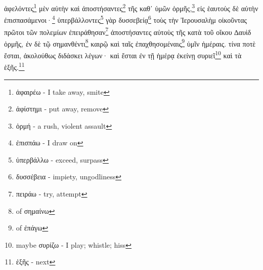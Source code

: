 ἀφελόντες\footnote{ἀφαιρέω - I take away, smite}
μὲν
αὐτὴν
καὶ
ἀποστήσαντες\footnote{ἀφίστημι - put away, remove}
τῆς
καθ᾽
ὑμῶν
ὁρμῆς,\footnote{ὁρμή - a rush, violent assault}
εἰς
ἑαυτοὺς
δὲ
αὐτὴν
ἐπισπασάμενοι·\footnote{ἐπισπάω - I draw on}
ὑπερβάλλοντες\footnote{ὑπερβάλλω - exceed, surpass}
γὰρ
δυσσεβείᾳ\footnote{δυσσέβεια - impiety, ungodliness}
τοὺς
τὴν
Ἰερουσαλὴμ
οἰκοῦντας
πρῶτοι
τῶν
πολεμίων
ἐπειράθησαν\footnote{πειράω - try, attempt}
ἀποστήσαντες
αὐτοὺς
τῆς
κατὰ
τοῦ
οἴκου
∆αυὶδ
ὁρμῆς,
ἐν
δὲ
τῷ
σημανθέντι\footnote{ of σημαίνω}
καιρῷ
καὶ
ταῖς
ἐπαχθησομέναις\footnote{ of ἐπάγω}
ὑμῖν
ἡμέραις.
τίνα
ποτὲ
ἔσται,
ἀκολούθως
διδάσκει
λέγων·
καὶ
ἔσται
ἐν
τῇ
ἡμέρᾳ
ἐκείνῃ
συριεῖ\footnote{maybe συρίζω - I play; whistle; hiss}
καὶ
τὰ
ἑξῆς.\footnote{ἑξῆς - next}






